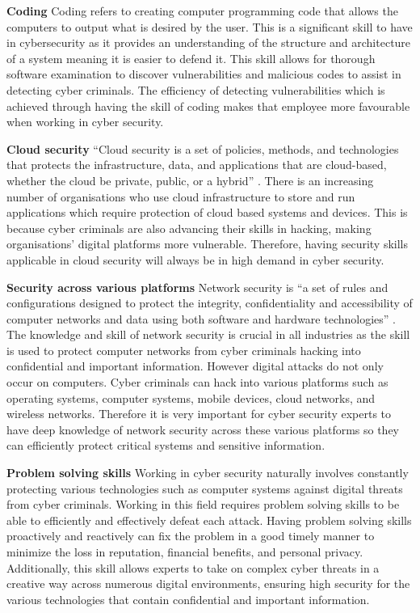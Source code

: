 \documentclass[a4paper, 11pt]{report}
\begin{document}
\textbf{Coding}
Coding refers to creating computer programming code that allows the computers to output what is desired by the user. This is a significant skill to have in cybersecurity as it provides an understanding of the structure and architecture of a system meaning it is easier to defend it. This skill allows for thorough software examination to discover vulnerabilities and malicious codes to assist in detecting cyber criminals. The efficiency of detecting vulnerabilities which is achieved through having the skill of coding makes that employee more favourable when working in cyber security.

\textbf{Cloud security}
“Cloud security is a set of policies, methods, and technologies that protects the infrastructure, data, and applications that are cloud-based, whether the cloud be private, public, or a hybrid” \cite{l1}. There is an increasing number of organisations who use cloud infrastructure to store and run applications which require protection of cloud based systems and devices. This is because cyber criminals are also advancing their skills in hacking, making organisations’ digital platforms more vulnerable. Therefore, having security skills applicable in cloud security will always be in high demand in cyber security. 

\textbf{Security across various platforms}
Network security is “a set of rules and configurations designed to protect the integrity, confidentiality and accessibility of computer networks and data using both software and hardware technologies” \cite{l2}. The knowledge and skill of network security is crucial in all industries as the skill is used to protect computer networks from cyber criminals hacking into confidential and important information. However digital attacks do not only occur on computers. Cyber criminals can hack into various platforms such as operating systems, computer systems, mobile devices, cloud networks, and wireless networks. Therefore it is very important for cyber security experts to have deep knowledge of network security across these various platforms so they can efficiently protect critical systems and sensitive information. 

\textbf{Problem solving skills}
Working in cyber security naturally involves constantly protecting various technologies such as computer systems against digital threats from cyber criminals. Working in this field requires problem solving skills to be able to efficiently and effectively defeat each attack. Having problem solving skills proactively and reactively can fix the problem in a good timely manner to minimize the loss in reputation, financial benefits, and personal privacy. Additionally, this skill allows experts to take on complex cyber threats in a creative way across numerous digital environments, ensuring high security for the various technologies that contain confidential and important information. 
\end{document}
